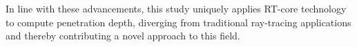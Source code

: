 In line with these advancements, this study uniquely applies RT-core technology to compute penetration depth, diverging from traditional ray-tracing applications and thereby contributing a novel approach to this field.








